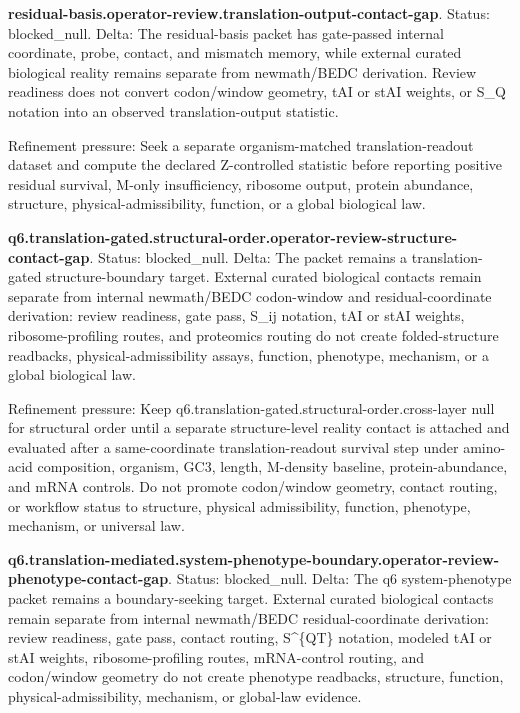 \textbf{residual-basis.operator-review.translation-output-contact-gap}. Status: blocked\_null. Delta: The residual-basis packet has gate-passed internal coordinate, probe, contact, and mismatch memory, while external curated biological reality remains separate from newmath/BEDC derivation. Review readiness does not convert codon/window geometry, tAI or stAI weights, or S\_Q notation into an observed translation-output statistic.

Refinement pressure: Seek a separate organism-matched translation-readout dataset and compute the declared Z-controlled statistic before reporting positive residual survival, M-only insufficiency, ribosome output, protein abundance, structure, physical-admissibility, function, or a global biological law.

\textbf{q6.translation-gated.structural-order.operator-review-structure-contact-gap}. Status: blocked\_null. Delta: The packet remains a translation-gated structure-boundary target. External curated biological contacts remain separate from internal newmath/BEDC codon-window and residual-coordinate derivation: review readiness, gate pass, S\_ij notation, tAI or stAI weights, ribosome-profiling routes, and proteomics routing do not create folded-structure readbacks, physical-admissibility assays, function, phenotype, mechanism, or a global biological law.

Refinement pressure: Keep q6.translation-gated.structural-order.cross-layer null for structural order until a separate structure-level reality contact is attached and evaluated after a same-coordinate translation-readout survival step under amino-acid composition, organism, GC3, length, M-density baseline, protein-abundance, and mRNA controls. Do not promote codon/window geometry, contact routing, or workflow status to structure, physical admissibility, function, phenotype, mechanism, or universal law.

\textbf{q6.translation-mediated.system-phenotype-boundary.operator-review-phenotype-contact-gap}. Status: blocked\_null. Delta: The q6 system-phenotype packet remains a boundary-seeking target. External curated biological contacts remain separate from internal newmath/BEDC residual-coordinate derivation: review readiness, gate pass, contact routing, S\textasciicircum{}\{QT\} notation, modeled tAI or stAI weights, ribosome-profiling routes, mRNA-control routing, and codon/window geometry do not create phenotype readbacks, structure, function, physical-admissibility, mechanism, or global-law evidence.

